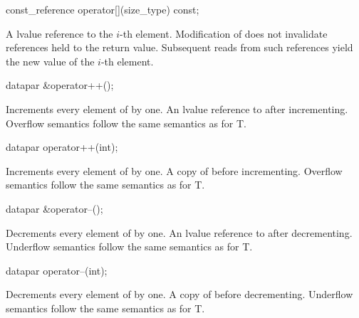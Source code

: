 \begin{wgText}
  \begin{itemdecl}
const_reference operator[](size_type) const;
  \end{itemdecl}
  \begin{itemdescr}
    \pnum\returns A \const lvalue reference to the $i$-th element.
    \pnum\postconditions Modification of  does not invalidate references held to the return value.
    Subsequent reads from such references yield the new value of the $i$-th element.
  \end{itemdescr}

  \begin{itemdecl}
datapar &operator++();
  \end{itemdecl}
  \begin{itemdescr}
    \pnum\effects Increments every element of  by one.
    \pnum\returns An lvalue reference to  after incrementing.
    \pnum\remarks Overflow semantics follow the same semantics as for \type T.
  \end{itemdescr}

  \begin{itemdecl}
datapar operator++(int);
  \end{itemdecl}
  \begin{itemdescr}
    \pnum\effects Increments every element of  by one.
    \pnum\returns A copy of  before incrementing.
    \pnum\remarks Overflow semantics follow the same semantics as for \type T.
  \end{itemdescr}

  \begin{itemdecl}
datapar &operator--();
  \end{itemdecl}
  \begin{itemdescr}
    \pnum\effects Decrements every element of  by one.
    \pnum\returns An lvalue reference to  after decrementing.
    \pnum\remarks Underflow semantics follow the same semantics as for \type T.
  \end{itemdescr}

  \begin{itemdecl}
datapar operator--(int);
  \end{itemdecl}
  \begin{itemdescr}
    \pnum\effects Decrements every element of  by one.
    \pnum\returns A copy of  before decrementing.
    \pnum\remarks Underflow semantics follow the same semantics as for \type T.
  \end{itemdescr}


\end{wgText}
